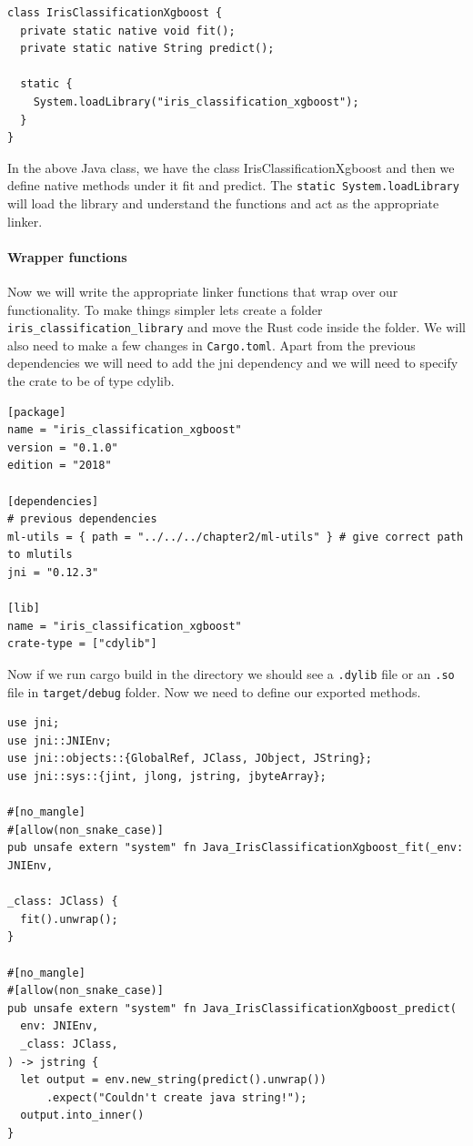 \documentclass{book}
\begin{document}
\begin{lstlisting}[caption={chapter8/iris\_classification\_xgboost/iris\_classification\_library/src/lib.rs}, basicstyle=\small]
class IrisClassificationXgboost {
  private static native void fit();
  private static native String predict();

  static {
    System.loadLibrary("iris_classification_xgboost");
  }
}
\end{lstlisting}

In the above Java class, we have the class IrisClassificationXgboost and then we define native methods under it fit and predict. The \lstinline{static System.loadLibrary} will load the library and understand the functions and act as the appropriate linker.

\label{par:java_class}

\paragraph{Wrapper functions}%
Now we will write the appropriate linker functions that wrap over our functionality. To make things simpler lets create a folder \lstinline{iris_classification_library} and move the Rust code inside the folder. We will also need to make a few changes in \lstinline{Cargo.toml}. Apart from the previous dependencies we will need to add the jni dependency and we will need to specify the crate to be of type cdylib.

\begin{lstlisting}[caption={chapter8/iris\_classification\_xgboost/iris\_classification\_library/Cargo.toml}, basicstyle=\small]
[package]
name = "iris_classification_xgboost"
version = "0.1.0"
edition = "2018"

[dependencies]
# previous dependencies
ml-utils = { path = "../../../chapter2/ml-utils" } # give correct path to mlutils
jni = "0.12.3"

[lib]
name = "iris_classification_xgboost"
crate-type = ["cdylib"]
\end{lstlisting}

Now if we run cargo build in the directory we should see a \lstinline{.dylib} file or an \lstinline{.so} file in \lstinline{target/debug} folder. Now we need to define our exported methods.

\begin{lstlisting}[caption={chapter8/iris\_classification\_xgboost/iris\_classification\_library/src/lib.rs}, basicstyle=\small]
use jni;
use jni::JNIEnv;
use jni::objects::{GlobalRef, JClass, JObject, JString};
use jni::sys::{jint, jlong, jstring, jbyteArray};

#[no_mangle]
#[allow(non_snake_case)]
pub unsafe extern "system" fn Java_IrisClassificationXgboost_fit(_env: JNIEnv,
                                                                 _class: JClass) {
  fit().unwrap();
}

#[no_mangle]
#[allow(non_snake_case)]
pub unsafe extern "system" fn Java_IrisClassificationXgboost_predict(
  env: JNIEnv,
  _class: JClass,
) -> jstring {
  let output = env.new_string(predict().unwrap())
      .expect("Couldn't create java string!");
  output.into_inner()
}
\end{lstlisting}
\end{document}
